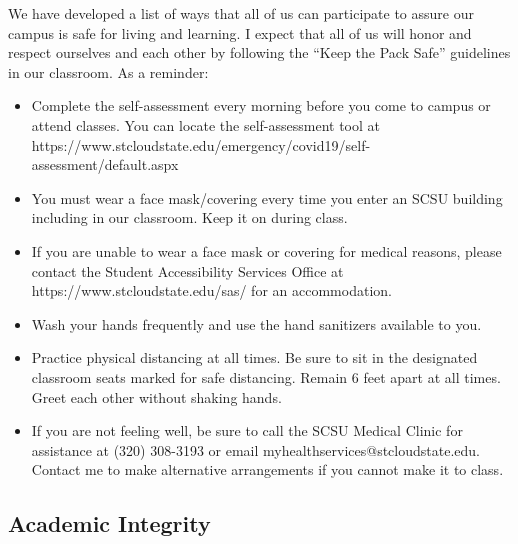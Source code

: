 \documentclass{tufte-handout}
\begin{document}
\begin{fullwidth}
We have developed a list of ways that all of us can participate to assure our campus is safe for living and learning. I expect that all of us will honor and respect ourselves and each other by following the ``Keep the Pack Safe'' guidelines in our classroom. As a reminder:

\begin{itemize}
\item Complete the self-assessment every morning before you come to campus or attend classes. You can locate the self-assessment tool at https://www.stcloudstate.edu/emergency/covid19/self-assessment/default.aspx 
\item You must wear a face mask/covering every time you enter an SCSU building including in our classroom. Keep it on during class.
\item If you are unable to wear a face mask or covering for medical reasons, please contact the Student Accessibility Services Office at https://www.stcloudstate.edu/sas/ for an accommodation.
\item Wash your hands frequently and use the hand sanitizers available to you.
\item Practice physical distancing at all times. Be sure to sit in the designated classroom seats marked for safe distancing. Remain 6 feet apart at all times. Greet each other without shaking hands.
\item If you are not feeling well, be sure to call the SCSU Medical Clinic for assistance at (320) 308-3193 or email myhealthservices@stcloudstate.edu. Contact me to make alternative arrangements if you cannot make it to class.
\end{itemize}

\subsection{Academic Integrity}




\end{fullwidth}
\end{document}
